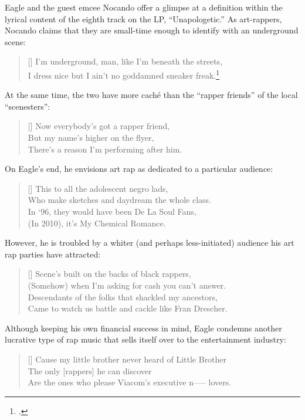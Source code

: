 Eagle and the guest emcee Nocando offer a glimpse at a definition within the lyrical content of
the eighth track on the LP, ``Unapologetic.'' As art-rappers, Nocando claims that they are 
small-time enough to identify with an underground scene:
\settowidth{\versewidth}{I dress nice but I ain't no goddamned sneaker freak.}
    \begin{verse}[\versewidth]
        \small I'm underground, man, like I'm beneath the streets, \\ 
        \small I dress nice but I ain't no goddamned sneaker freak.\footnote{
            \cite{openmikeeagle2010}.}
    \end{verse}
At the same time, the two have more caché than the ``rapper friends''  of the local  
``scenesters'':
\settowidth{\versewidth}{There's a reason I'm performing after him.}
    \begin{verse}[\versewidth]
        \small Now everybody's got a rapper friend, \\ 
        \small But my name's higher on the flyer,\\
        \small There's a reason I'm performing after him.
    \end{verse}
On Eagle's end, he envisions art rap as dedicated to a particular audience:
\settowidth{\versewidth}{Who make sketches and daydream the whole class.}
    \begin{verse}[\versewidth]
        \small This to all the adolescent negro lads, \\
        \small Who make sketches and daydream the whole class. \\
        \small In `96, they would have been De La Soul Fans, \\
        \small (In 2010), it's My Chemical Romance.
    \end{verse}
However, he is troubled by a whiter (and perhaps less-initiated) audience his art rap 
parties have attracted:
\settowidth{\versewidth}{Came to watch us battle and cackle like Fran Drescher.}
    \begin{verse}[\versewidth]
        \small Scene's built on the backs of black rappers, \\
        \small (Somehow) when I'm asking for cash you can't answer. \\ 
        \small Descendants of the folks that shackled my ancestors, \\ 
        \small Came to watch us battle and cackle like Fran Drescher.
    \end{verse}
Although keeping his own financial success in mind, Eagle condemns another lucrative type of rap
music that sells itself over to the entertainment industry:
\settowidth{\versewidth}{Cause my little brother never heard of Little Brother \textellipsis}
    \begin{verse}[\versewidth]
        \small Cause my little brother never heard of Little Brother \textellipsis \\ 
        \small The only [rappers] he can discover \\
        \small Are the ones who please Viacom's executive n----- lovers.
    \end{verse}

